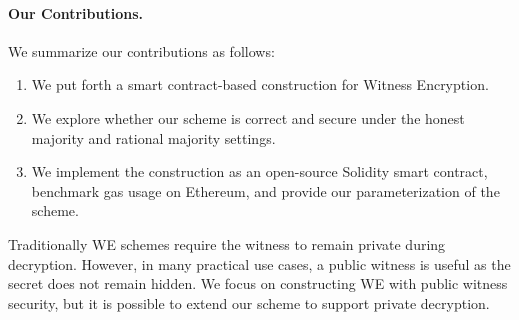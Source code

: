 \paragraph{Our Contributions.} We summarize our contributions as follows:
\begin{enumerate}
    \item We put forth a smart contract-based construction for Witness Encryption.
    \item We explore whether our scheme is correct and secure under the honest majority and rational majority settings.
    \item We implement the construction as an open-source Solidity smart contract, benchmark gas usage on Ethereum, and provide our parameterization of the scheme.
\end{enumerate}

Traditionally WE schemes require the witness to remain private during decryption.
However, in many practical use cases, a public witness is useful as the secret does not remain hidden.
We focus on constructing WE with public witness security, but it is possible to extend our scheme to support private decryption.
